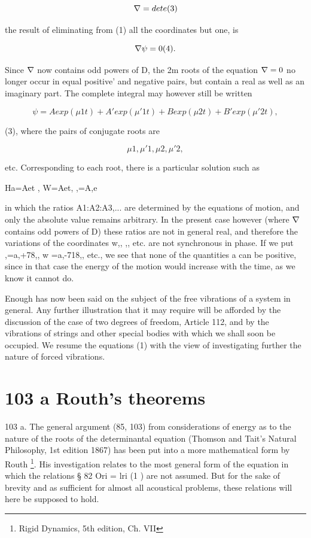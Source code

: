 \[\nabla = det e (3)\]

the result of eliminating from (1) all the coordinates but one, is

\[\nabla \psi = 0 (4).\]

Since \(\nabla\) now contains odd powers of D, the 2m roots of the equation
\(\nabla = 0\) no longer occur in equal positive' and negative pairs, but
contain a real as well as an imaginary part. The complete integral may however
still be written

\[\psi = A exp( \mu 1 t) + A' exp( \mu' 1 t) + B exp( \mu 2 t) + B' exp( \mu' 2 t),\]

(3), where the pairs of conjugate roots are

\[\mu 1, \mu' 1, \mu 2, \mu' 2,\]

etc. Corresponding to each root, there is a particular solution such as

Ha=Aet , W=Aet, ,=A,e

in which the ratios A1:A2:A3,... are determined by the equations of motion, and
only the absolute value remains arbitrary. In the present case however (where
\(\nabla\) contains odd powers of D) these ratios are not in general real, and
therefore the variations of the coordinates w,, ,, etc. are not synchronous in
phase. If we put ,=a,+78,, w =a,-718,, etc., we see that none of the quantities
a can be positive, since in that case the energy of the motion would increase
with the time, as we know it cannot do.

Enough has now been said on the subject of the free vibrations of a system in
general. Any further illustration that it may require will be afforded by the
discussion of the case of two degrees of freedom, Article 112, and by the
vibrations of strings and other special bodies with which we shall soon be
occupied. We resume the equations (1) with the view of investigating further
the nature of forced vibrations.

\section{103 a Routh's theorems} 103 a.
The general argument (85, 103) from considerations
of energy as to the nature of the roots of the determinantal
equation (Thomson and Tait’s Natural Philosophy, 1st edition 1867)
has been put into a more mathematical form by Routh
\footnote{Rigid Dynamics, 5th edition, Ch. VII}.
His investigation relates to the most general form of the equation in
which the relations § 82
Ori =  lri (1 )
are not assumed. But for the sake of brevity and as sufficient
for almost all acoustical problems, these relations will here be
supposed to hold.

